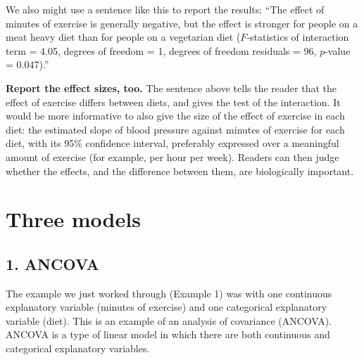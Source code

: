 \documentclass[
  letterpaper,
  8pt,
  a4paper]{book}
\begin{document}
We also might use a sentence like this to report the results: ``The
effect of minutes of exercise is generally negative, but the effect is
stronger for people on a meat heavy diet than for people on a vegetarian
diet (\(F\)-statistics of interaction term = 4.05, degrees of freedom =
1, degrees of freedom residuals = 96, \(p\)-value = 0.047).''

\begin{tcolorbox}[enhanced jigsaw, arc=.35mm, bottomrule=.15mm, bottomtitle=1mm, breakable, colback=white, colbacktitle=quarto-callout-tip-color!10!white, colframe=quarto-callout-tip-color-frame, coltitle=black, left=2mm, leftrule=.75mm, opacityback=0, opacitybacktitle=0.6, rightrule=.15mm, title=\textcolor{quarto-callout-tip-color}{\faLightbulb}\hspace{0.5em}{Tip}, titlerule=0mm, toprule=.15mm, toptitle=1mm]

\textbf{Report the effect sizes, too.} The sentence above tells the
reader that the effect of exercise differs between diets, and gives the
test of the interaction. It would be more informative to also give the
size of the effect of exercise in each diet: the estimated slope of
blood pressure against minutes of exercise for each diet, with its 95\%
confidence interval, preferably expressed over a meaningful amount of
exercise (for example, per hour per week). Readers can then judge
whether the effects, and the difference between them, are biologically
important.

\end{tcolorbox}

\section*{Three models}\label{three-models}


\subsection*{1. ANCOVA}\label{ancova}

The example we just worked through (Example 1) was with one continuous
explanatory variable (minutes of exercise) and one categorical
explanatory variable (diet). This is an example of an analysis of
covariance (ANCOVA). ANCOVA is a type of linear model in which there are
both continuous and categorical explanatory variables.
\end{document}
